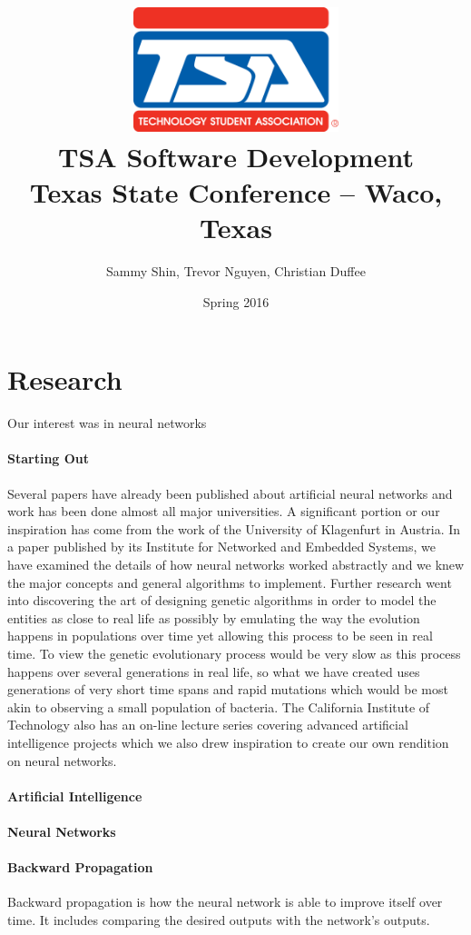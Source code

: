 \documentclass[letterpaper, 10pt]{article}
\title{
	\includegraphics[width=6.0cm]{res/TSA-Emblem.png} \\
	\vspace{1.15cm}
	TSA Software Development \\
	Texas State Conference -- Waco, Texas\\
	\vspace{0.75cm}
}
\author{Sammy Shin, Trevor Nguyen, Christian Duffee}
\date{Spring 2016}
\begin{document}
\maketitle

\cleardoublepage

\tableofcontents

\cleardoublepage
\section{Research}
	Our interest was in neural networks

	\paragraph{Starting Out}
	Several papers have already been published about artificial neural networks and work has been done almost all major universities. A significant portion or our inspiration has come from the work of the University of Klagenfurt in Austria. In a paper published by its Institute for Networked and Embedded Systems, we have examined the details of how neural networks worked abstractly and we knew the major concepts and general algorithms to implement. Further research went into discovering the art of designing genetic algorithms in order to model the entities as close to real life as possibly by emulating the way the evolution happens in populations over time yet allowing this process to be seen in real time. To view the genetic evolutionary process would be very slow as this process happens over several generations in real life, so what we have created uses generations of very short time spans and rapid mutations which would be most akin to observing a small population of bacteria. The California Institute of Technology also has an on-line lecture series covering advanced artificial intelligence projects which we also drew inspiration to create our own rendition on neural networks.
	
	\paragraph{Artificial Intelligence}
	
	\paragraph{Neural Networks}
	
	
	\paragraph{Backward Propagation}
	Backward propagation is how the neural network is able to improve itself over time. It includes comparing the desired outputs with the network's outputs.
	
\end{document}
